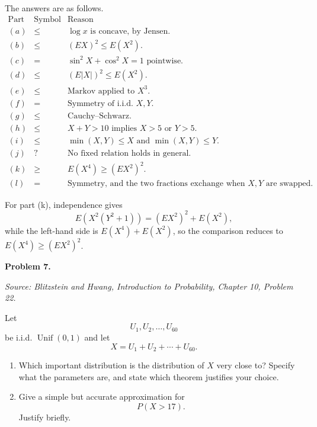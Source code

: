 \documentclass[11pt]{article}
\newcommand{\source}[2]{%
    \vspace{0.15cm}
    {\small\textit{Source: Blitzstein and Hwang, \textit{Introduction to Probability}, Chapter #1, Problem #2.}}
}
\begin{document}
\begin{solutionbox}
The answers are as follows.
\[
\begin{array}{c|c|l}
\text{Part} & \text{Symbol} & \text{Reason}\\ \hline
(a) & \le & \log x\text{ is concave, by Jensen.}\\
(b) & \le & (E X)^2\le E(X^2).\\
(c) & = & \sin^2 X+\cos^2 X=1\text{ pointwise.}\\
(d) & \le & (E|X|)^2\le E(X^2).\\
(e) & \le & \text{Markov applied to }X^3.\\
(f) & = & \text{Symmetry of i.i.d. }X,Y.\\
(g) & \le & \text{Cauchy--Schwarz.}\\
(h) & \le & X+Y>10\text{ implies }X>5\text{ or }Y>5.\\
(i) & \le & \min(X,Y)\le X\text{ and }\min(X,Y)\le Y.\\
(j) & ? & \text{No fixed relation holds in general.}\\
(k) & \ge & E(X^4)\ge (E X^2)^2.\\
(l) & = & \text{Symmetry, and the two fractions exchange when }X,Y\text{ are swapped.}
\end{array}
\]

For part (k), independence gives
\[
E\!\left(X^2(Y^2+1)\right)=(E X^2)^2+E(X^2),
\]
while the left-hand side is $E(X^4)+E(X^2)$, so the comparison reduces to $E(X^4)\ge (E X^2)^2$.
 
\end{solutionbox}
\newpage

 


\begin{problemheader}
\textbf{Problem 7.}
\end{problemheader}
\source{10}{22}

Let
\[
U_1,U_2,\dots,U_{60}
\]
be i.i.d. $\operatorname{Unif}(0,1)$ and let
\[
X=U_1+U_2+\cdots+U_{60}.
\]

\begin{enumerate}[label=(\alph*), leftmargin=*]
    \item Which important distribution is the distribution of $X$ very close to? Specify what the parameters are, and state which theorem justifies your choice.

    \item Give a simple but accurate approximation for
    \[
    P(X>17).
    \]
    Justify briefly.
\end{enumerate}
\end{document}
